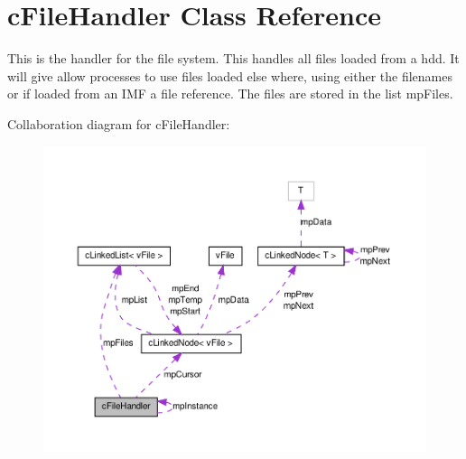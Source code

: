 \hypertarget{classc_file_handler}{
\section{cFileHandler Class Reference}
\label{classc_file_handler}
}


This is the handler for the file system. This handles all files loaded from a hdd. It will give allow processes to use files loaded else where, using either the filenames or if loaded from an IMF a file reference. The files are stored in the list mpFiles.  




Collaboration diagram for cFileHandler:
\nopagebreak
\begin{figure}[H]
\begin{center}
\leavevmode
\includegraphics[width=400pt]{classc_file_handler__coll__graph}
\end{center}
\end{figure}
